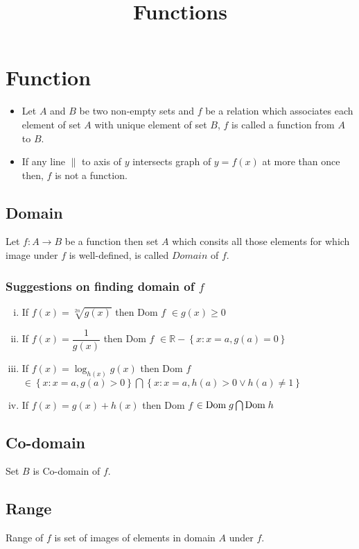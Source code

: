 \documentclass{article}
\title{Functions}
\author{}
\date{}
\begin{document}
\maketitle

\section{Function}
\begin{itemize}
    \item Let $A$ and $B$ be two non-empty sets and $f$ be a relation which associates each element of set $A$ with unique element of set $B$, $f$ is called a function from $A$ to $B$.
    \item If any line $\parallel$ to axis of $y$ intersects graph of $y=f(x)$ at more than once then, $f$ is not a function.
\end{itemize}

\subsection{Domain}
Let $f:A \rightarrow B$ be a function then set $A$ which consits all those elements for which image under $f$ is well-defined, is called $Domain$ of $f$.

\subsubsection{Suggestions on finding domain of $f$}
\begin{enumerate}[i.]
    \item If $f(x)=\sqrt[2n]{g(x)}$ then Dom $f$ $\in g(x) \geq 0$
    \item If $f(x)=\dfrac{1}{g(x)}$ then Dom $f$ $\in \mathbb{R}-\left\{x:x=a, g(a)=0\right\}$
    \item If $f(x)=\log_{h(x)}{g(x)}$ then Dom $f$ $\in \left\{x:x=a,g(a)> 0\right\} \bigcap \left\{x:x=a, h(a)>0 \lor h(a) \not= 1\right\}$
    \item If $f(x)=g(x) + h(x)$ then Dom $f$ $\in \text{Dom} \hspace{1mm} g \bigcap \text{Dom} \hspace{1mm} h$
\end{enumerate}
\subsection{Co-domain}
Set $B$ is Co-domain of $f$.
\subsection{Range}
Range of $f$ is set of images of elements in domain $A$ under $f$.
\end{document}
